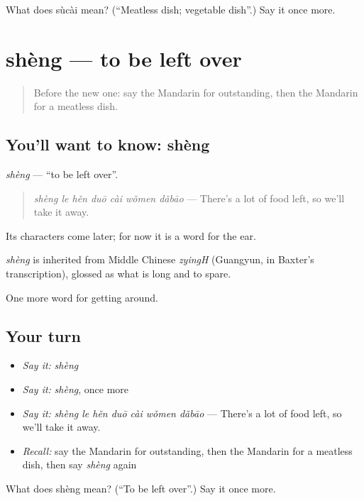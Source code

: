 \begin{tcolorbox}[breakable,colback=teal!4,colframe=teal!35!black,title={Before you move on}]
What does sùcài mean? (\textquotedblleft{}Meatless dish; vegetable dish\textquotedblright{}.) Say it once more.
\end{tcolorbox}
\section[shèng]{shèng — to be left over}

\label{lesson:ZH-C451-sheng}



\begin{quote}
Before the new one: say the Mandarin for outstanding, then the Mandarin for a meatless dish.
\end{quote}

\subsection*{You'll want to know: shèng}
\emph{shèng} — \textquotedblleft{}to be left over\textquotedblright{}.

\begin{quote}
\emph{shèng le hěn duō cài wǒmen dǎbāo} — There's a lot of food left, so we'll take it away.
\end{quote}

Its characters come later; for now it is a word for the ear.

\begin{cousinweb}
\emph{shèng} is inherited from Middle Chinese \emph{zyingH} (Guangyun, in Baxter's transcription), glossed as what is long and to spare.
\end{cousinweb}

\begin{grammarlens}[title={What you've built}]
One more word for getting around.
\end{grammarlens}

\subsection*{Your turn}
\begin{itemize}
\raggedright
  \item \emph{Say it:} \emph{shèng}
  \item \emph{Say it:} \emph{shèng}, once more
  \item \emph{Say it:} \emph{shèng le hěn duō cài wǒmen dǎbāo} — There's a lot of food left, so we'll take it away.
  \item \emph{Recall:} say the Mandarin for outstanding, then the Mandarin for a meatless dish, then say \emph{shèng} again
\end{itemize}

\begin{tcolorbox}[breakable,colback=teal!4,colframe=teal!35!black,title={Before you move on}]
What does shèng mean? (\textquotedblleft{}To be left over\textquotedblright{}.) Say it once more.
\end{tcolorbox}
